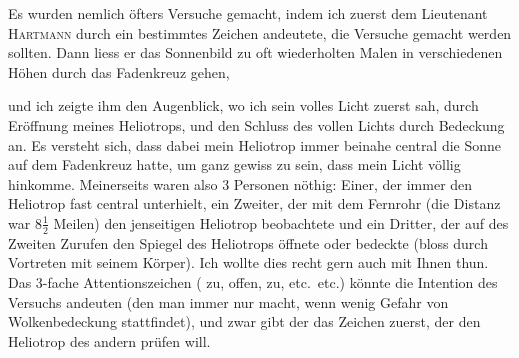 Es wurden nemlich öfters Versuche gemacht, indem ich zuerst dem Lieutenant \textsc{Hartmann} durch ein bestimmtes Zeichen andeutete,  die Versuche gemacht werden sollten.
Dann liess er das Sonnenbild zu oft wiederholten Malen in verschiedenen Höhen durch das Fadenkreuz gehen,
\par\vspace{.7cm}
{\centering
{}\par}
\vspace{.7cm}\noindent und ich zeigte ihm den Augenblick, wo ich sein volles Licht zuerst sah, durch Eröffnung meines Heliotrops, und den Schluss des vollen Lichts durch Bedeckung an.
Es versteht sich, dass dabei mein Heliotrop immer beinahe central die Sonne auf dem Fadenkreuz hatte, um ganz gewiss zu sein, dass mein Licht völlig hinkomme.
Meinerseits waren also 3 Personen nöthig: Einer, der immer den Heliotrop fast central unterhielt, ein Zweiter, der mit dem Fernrohr (die Distanz war \(8\frac{1}{2}\) Meilen) den jenseitigen Heliotrop beobachtete und ein Dritter, der auf des Zweiten Zurufen den Spiegel des Heliotrops öffnete oder bedeckte (bloss durch Vortreten mit seinem Körper).
Ich wollte dies recht gern auch mit Ihnen thun.
Das 3-fache Attentionszeichen ( zu,  offen,  zu, etc.\ etc.) könnte die Intention des Versuchs andeuten (den man immer nur macht, wenn wenig Gefahr von Wolkenbedeckung stattfindet), und zwar gibt der das Zeichen zuerst, der den Heliotrop des andern prüfen will.
